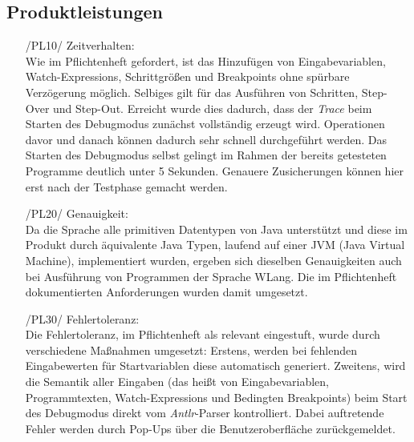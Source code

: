 \documentclass[parskip=full]{scrartcl}
\begin{document}
		\subsection{Produktleistungen}
		\begin{itemize}
		\item[/PL10/] Zeitverhalten: \\ Wie im Pflichtenheft gefordert, ist das Hinzufügen von Eingabevariablen, Watch-Expressions, Schrittgrößen und Breakpoints ohne spürbare Verzögerung möglich. Selbiges gilt für das Ausführen von Schritten, Step-Over und Step-Out. Erreicht wurde dies dadurch, dass der \textit{Trace} beim Starten des Debugmodus zunächst vollständig erzeugt wird. Operationen davor und danach können dadurch sehr schnell durchgeführt werden. Das Starten des Debugmodus selbst gelingt im Rahmen der bereits getesteten Programme deutlich unter 5 Sekunden. Genauere Zusicherungen können hier erst nach der Testphase gemacht werden.

		\item[/PL20/] Genauigkeit: \\
		Da die Sprache alle primitiven Datentypen von Java unterstützt und diese im Produkt durch äquivalente Java Typen, laufend auf einer JVM (Java Virtual Machine), implementiert wurden, ergeben sich dieselben Genauigkeiten auch bei Ausführung von Programmen der Sprache WLang. Die im Pflichtenheft dokumentierten Anforderungen wurden damit umgesetzt.

		\item[/PL30/] Fehlertoleranz: \\
		Die Fehlertoleranz, im Pflichtenheft als relevant eingestuft, wurde durch verschiedene Maßnahmen umgesetzt: Erstens, werden bei fehlenden Eingabewerten für Startvariablen diese automatisch generiert. Zweitens, wird die Semantik aller Eingaben (das heißt von Eingabevariablen, Programmtexten, Watch-Expressions und Bedingten Breakpoints) beim Start des Debugmodus direkt vom \textit{Antlr}-Parser kontrolliert. Dabei auftretende Fehler werden durch Pop-Ups über die Benutzeroberfläche zurückgemeldet.
		\end{itemize}
		
\end{document}
